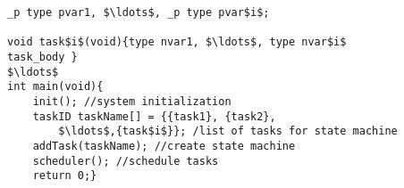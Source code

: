 \documentclass[border={20pt 5pt 105pt 10pt}]{standalone} %
\begin{document}
	

\begin{lstlisting}[style = mystyle]
_p type pvar1, $\ldots$, _p type pvar$i$;

void task$i$(void){type nvar1, $\ldots$, type nvar$i$
task_body }
$\ldots$
int main(void){
	init(); //system initialization
	taskID taskName[] = {{task1}, {task2}, 
		$\ldots$,{task$i$}}; /list of tasks for state machine
	addTask(taskName); //create state machine
	scheduler(); //schedule tasks
	return 0;}
\end{lstlisting} 
\end{document}
